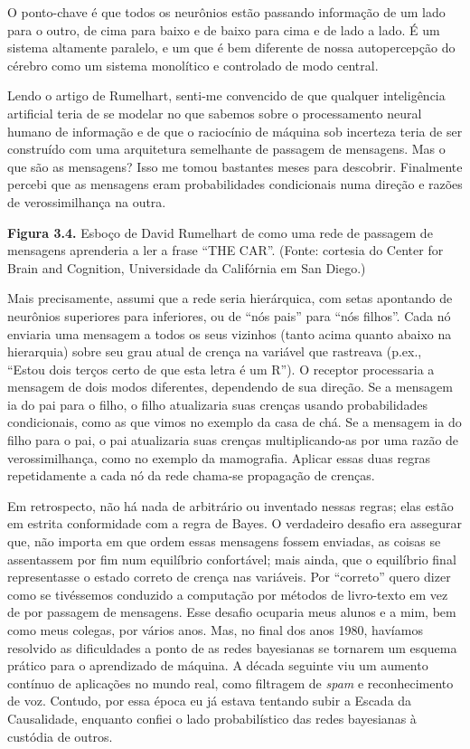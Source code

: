 \documentclass[11pt,a5paper,twoside]{book}
\begin{document}
O ponto-chave é que todos os neurônios estão passando informação de um lado para o outro, de cima para baixo e de baixo para cima e de lado a lado. É um sistema altamente paralelo, e um que é bem diferente de nossa autopercepção do cérebro como um sistema monolítico e controlado de modo central.

Lendo o artigo de Rumelhart, senti-me convencido de que qualquer inteligência artificial teria de se modelar no que sabemos sobre o processamento neural humano de informação e de que o raciocínio de máquina sob incerteza teria de ser construído com uma arquitetura semelhante de passagem de mensagens. Mas o que são as mensagens? Isso me tomou bastantes meses para descobrir. Finalmente percebi que as mensagens eram probabilidades condicionais numa direção e razões de verossimilhança na outra.

\textbf{Figura 3.4.} Esboço de David Rumelhart de como uma rede de passagem de mensagens aprenderia a ler a frase “THE CAR”. (Fonte: cortesia do Center for Brain and Cognition, Universidade da Califórnia em San Diego.)

Mais precisamente, assumi que a rede seria hierárquica, com setas apontando de neurônios superiores para inferiores, ou de “nós pais” para “nós filhos”. Cada nó enviaria uma mensagem a todos os seus vizinhos (tanto acima quanto abaixo na hierarquia) sobre seu grau atual de crença na variável que rastreava (p.ex., “Estou dois terços certo de que esta letra é um R”). O receptor processaria a mensagem de dois modos diferentes, dependendo de sua direção. Se a mensagem ia do pai para o filho, o filho atualizaria suas crenças usando probabilidades condicionais, como as que vimos no exemplo da casa de chá. Se a mensagem ia do filho para o pai, o pai atualizaria suas crenças multiplicando-as por uma razão de verossimilhança, como no exemplo da mamografia. Aplicar essas duas regras repetidamente a cada nó da rede chama-se propagação de crenças.

Em retrospecto, não há nada de arbitrário ou inventado nessas regras; elas estão em estrita conformidade com a regra de Bayes. O verdadeiro desafio era assegurar que, não importa em que ordem essas mensagens fossem enviadas, as coisas se assentassem por fim num equilíbrio confortável; mais ainda, que o equilíbrio final representasse o estado correto de crença nas variáveis. Por “correto” quero dizer como se tivéssemos conduzido a computação por métodos de livro-texto em vez de por passagem de mensagens. Esse desafio ocuparia meus alunos e a mim, bem como meus colegas, por vários anos. Mas, no final dos anos 1980, havíamos resolvido as dificuldades a ponto de as redes bayesianas se tornarem um esquema prático para o aprendizado de máquina. A década seguinte viu um aumento contínuo de aplicações no mundo real, como filtragem de \textit{spam} e reconhecimento de voz. Contudo, por essa época eu já estava tentando subir a Escada da Causalidade, enquanto confiei o lado probabilístico das redes bayesianas à custódia de outros.
\end{document}

